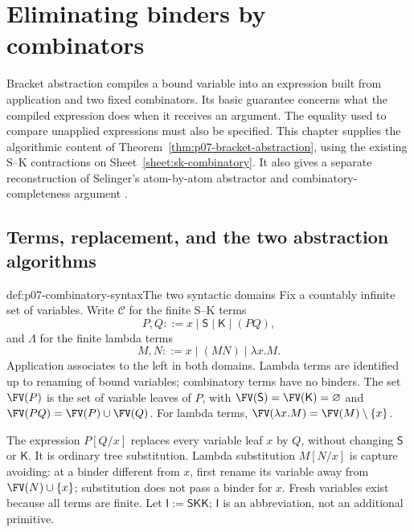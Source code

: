 \section{Eliminating binders by combinators}
\label{sec:p07-combinatory-abstraction}

Bracket abstraction compiles a bound variable into an expression built from
application and two fixed combinators.  Its basic guarantee concerns what the
compiled expression does when it receives an argument.  The equality used to
compare unapplied expressions must also be specified.  This chapter supplies
the algorithmic content of Theorem~\ref{thm:p07-bracket-abstraction}, using the
existing S--K contractions on Sheet~\ref{sheet:sk-combinatory}.
It also gives a separate reconstruction of Selinger's atom-by-atom abstractor
and combinatory-completeness argument
\cite[Sections 5.1--5.4; Lemma 5.10; Section 5.6]{Selinger2013LambdaNotesV2}.

\subsection{Terms, replacement, and the two abstraction algorithms}
\label{sec:p07-combinatory-algorithms}

\begin{hbdefinition}{def:p07-combinatory-syntax}{The two syntactic domains}
Fix a countably infinite set of variables.  Write \(\mathcal C\) for the finite
S--K terms
\[
 P,Q ::= x\mid\mathsf S\mid\mathsf K\mid(PQ),
\]
and \(\Lambda\) for the finite lambda terms
\[
 M,N ::= x\mid(MN)\mid\lambda x.M.
\]
Application associates to the left in both domains.  Lambda terms are identified
up to renaming of bound variables; combinatory terms have no binders.  The set
\(\FV(P)\) is the set of variable leaves of \(P\), with
\(\FV(\mathsf S)=\FV(\mathsf K)=\varnothing\) and
\(\FV(PQ)=\FV(P)\cup\FV(Q)\).  For lambda terms,
\(\FV(\lambda x.M)=\FV(M)\setminus\{x\}\).

The expression \(P[Q/x]\) replaces every variable leaf \(x\) by \(Q\), without
changing \(\mathsf S\) or \(\mathsf K\).  It is ordinary tree substitution.
Lambda substitution \(M[N/x]\) is capture avoiding: at a binder different from
\(x\), first rename its variable away from \(\FV(N)\cup\{x\}\); substitution
does not pass a binder for \(x\).  Fresh variables exist because all terms are
finite.  Let \(\mathsf I:=\mathsf S\mathsf K\mathsf K\); \(\mathsf I\) is
an abbreviation, not an additional primitive.
\end{hbdefinition}

